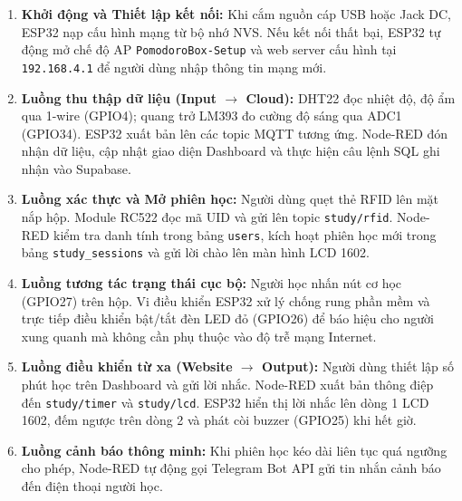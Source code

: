 \begin{enumerate}
    \item \textbf{Khởi động và Thiết lập kết nối:} Khi cắm nguồn cáp USB hoặc Jack DC, ESP32 nạp cấu hình mạng từ bộ nhớ NVS. Nếu kết nối thất bại, ESP32 tự động mở chế độ AP \texttt{PomodoroBox-Setup} và web server cấu hình tại \texttt{192.168.4.1} để người dùng nhập thông tin mạng mới.
    \item \textbf{Luồng thu thập dữ liệu (Input $\rightarrow$ Cloud):} DHT22 đọc nhiệt độ, độ ẩm qua 1-wire (GPIO4); quang trở LM393 đo cường độ sáng qua ADC1 (GPIO34). ESP32 xuất bản lên các topic MQTT tương ứng. Node-RED đón nhận dữ liệu, cập nhật giao diện Dashboard và thực hiện câu lệnh SQL ghi nhận vào Supabase.
    \item \textbf{Luồng xác thực và Mở phiên học:} Người dùng quẹt thẻ RFID lên mặt nắp hộp. Module RC522 đọc mã UID và gửi lên topic \texttt{study/rfid}. Node-RED kiểm tra danh tính trong bảng \texttt{users}, kích hoạt phiên học mới trong bảng \texttt{study\_sessions} và gửi lời chào lên màn hình LCD 1602.
    \item \textbf{Luồng tương tác trạng thái cục bộ:} Người học nhấn nút cơ học (GPIO27) trên hộp. Vi điều khiển ESP32 xử lý chống rung phần mềm và trực tiếp điều khiển bật/tắt đèn LED đỏ (GPIO26) để báo hiệu cho người xung quanh mà không cần phụ thuộc vào độ trễ mạng Internet.
    \item \textbf{Luồng điều khiển từ xa (Website $\rightarrow$ Output):} Người dùng thiết lập số phút học trên Dashboard và gửi lời nhắc. Node-RED xuất bản thông điệp đến \texttt{study/timer} và \texttt{study/lcd}. ESP32 hiển thị lời nhắc lên dòng 1 LCD 1602, đếm ngược trên dòng 2 và phát còi buzzer (GPIO25) khi hết giờ.
    \item \textbf{Luồng cảnh báo thông minh:} Khi phiên học kéo dài liên tục quá ngưỡng cho phép, Node-RED tự động gọi Telegram Bot API gửi tin nhắn cảnh báo đến điện thoại người học.
\end{enumerate}
